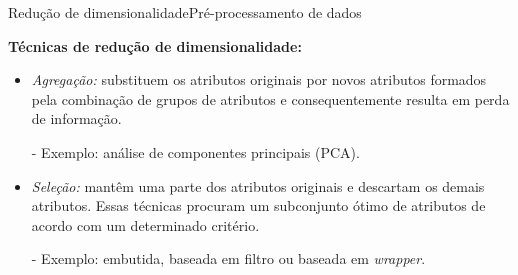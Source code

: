 \documentclass[t]{beamer}
\begin{document}

\begin{ftst}{Redução de dimensionalidade}{Pré-processamento de dados}

\textbf{Técnicas de redução de dimensionalidade:}
\small
\vone
\begin{itemize}
 \item \textit{Agregação:} substituem os atributos originais por novos atributos formados pela combinação de grupos de atributos e consequentemente resulta em perda de informação.
    
 - Exemplo: análise de componentes principais (PCA).
\vone
 \item \textit{Seleção:} mantêm uma parte dos atributos originais e descartam os demais atributos. Essas técnicas procuram um subconjunto ótimo de atributos de acordo com um determinado critério.
    
- Exemplo: embutida, baseada em filtro ou baseada em \textit{wrapper}.
\end{itemize}


\end{ftst}

\end{document}
